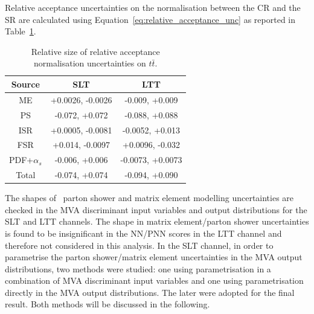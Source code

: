 
   
  


Relative acceptance uncertainties on the normalisation between the CR and the SR
are calculated using Equation~\ref{eq:relative_acceptance_unc} 
as reported in Table~\ref{sec:systs:tab:systematics_normalisations_ttbar}.


\begin{table}
\centering
\small
\begin{tabular}{|c|c|c|}
\hline
Source & SLT & LTT \\
\hline
ME & +0.0026, -0.0026 & -0.009, +0.009 \\
PS & -0.072, +0.072 & -0.088, +0.088 \\
ISR & +0.0005, -0.0081 & -0.0052, +0.013 \\
FSR & +0.014, -0.0097 & +0.0096, -0.032 \\
PDF+$\alpha_s$ & -0.006, +0.006 & -0.0073, +0.0073 \\
Total & -0.074, +0.074 & -0.094, +0.090 \\
\hline
\end{tabular}
\caption{Relative size of relative acceptance 
normalisation uncertainties on $t\bar{t}$.}
\label{sec:systs:tab:systematics_normalisations_ttbar}
\end{table}


The shapes of \ttbar\ parton shower and matrix element modelling uncertainties
are checked in the MVA discriminant input variables and output distributions 
for the SLT and LTT channels. The shape in matrix element/parton shower uncertainties 
is found to be 
insignificant in the NN/PNN scores in the LTT channel and 
therefore not considered in this analysis.
In the SLT channel, in order to parametrise the parton shower/matrix element uncertainties
in the MVA output distributions,
two methods were studied: one using parametrisation in
a combination of MVA discriminant input variables and one using parametrisation 
directly in the MVA output distributions.
The later were adopted for the final result. Both methods
will be discussed in the following. 


